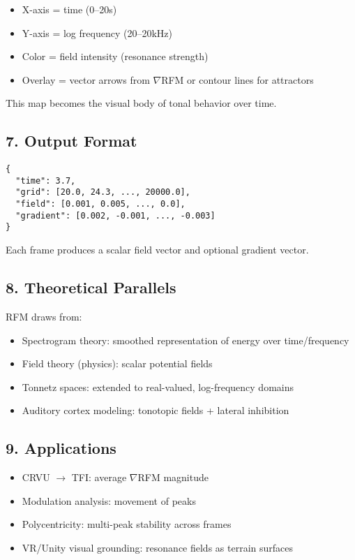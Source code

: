 \documentclass{article}
\begin{document}
\begin{itemize}
    \item X-axis = time (0–20s)
    \item Y-axis = log frequency (20–20kHz)
    \item Color = field intensity (resonance strength)
    \item Overlay = vector arrows from $\nabla$RFM or contour lines for attractors
\end{itemize}

This map becomes the visual body of tonal behavior over time.

\subsection*{7. Output Format}

\begin{verbatim}
{
  "time": 3.7,
  "grid": [20.0, 24.3, ..., 20000.0],
  "field": [0.001, 0.005, ..., 0.0],
  "gradient": [0.002, -0.001, ..., -0.003]
}
\end{verbatim}

Each frame produces a scalar field vector and optional gradient vector.

\subsection*{8. Theoretical Parallels}

RFM draws from:

\begin{itemize}
    \item Spectrogram theory: smoothed representation of energy over time/frequency
    \item Field theory (physics): scalar potential fields
    \item Tonnetz spaces: extended to real-valued, log-frequency domains
    \item Auditory cortex modeling: tonotopic fields + lateral inhibition
\end{itemize}

\subsection*{9. Applications}

\begin{itemize}
    \item CRVU $\rightarrow$ TFI: average $\nabla$RFM magnitude
    \item Modulation analysis: movement of peaks
    \item Polycentricity: multi-peak stability across frames
    \item VR/Unity visual grounding: resonance fields as terrain surfaces
\end{itemize}
\end{document}
